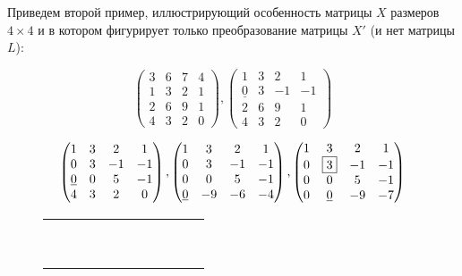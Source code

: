 {\noindent Приведем второй пример, иллюстрирующий особенность матрицы $X$
размеров $4 \times 4$ и в котором фигурирует только преобразование матрицы
$X'$ (и нет матрицы $L$):




\begin{equation*}
\begin{pmatrix} 3 & 6 & 7 & 4 \\ 1 & 3 & 2 & 1 \\ 2 & 6 & 9 & 1 \\ 4 & 3 & 2 & 0 \end{pmatrix}, \begin{pmatrix} 1 & 3 & 2 & 1 \\ \underline{0} & 3 & -1 & -1 \\ 2 & 6 & 9 & 1 \\ 4 & 3 & 2 & 0 \end{pmatrix}
\end{equation*}

\begin{equation*}
\begin{pmatrix} 1 & 3 & 2 & 1 \\ 0 & 3 & -1 & -1 \\ \underline{0} & 0 & 5 & -1 \\ 4 & 3 & 2 & 0 \end{pmatrix}, \begin{pmatrix} 1 & 3 & 2 & 1 \\ 0 & 3 & -1 & -1 \\ 0 & 0 & 5 & -1 \\ \underline{0} & -9 & -6 & -4 \end{pmatrix}, \begin{pmatrix} 1 & 3 & 2 & 1 \\ 0 & \fbox{3} & -1 & -1 \\ 0 & 0 & 5 & -1 \\ 0 & \underline{0} & -9 & -7 \end{pmatrix}
\end{equation*}

\begin{figure}[htp]
\centering
\begin{tabular}{c}
\begin{lstlisting}[mathescape=true, captionpos={bo}, caption={Обращение матрицы в кольце главных идеалов}]
					

\end{lstlisting}
\end{tabular}
\end{figure}}

